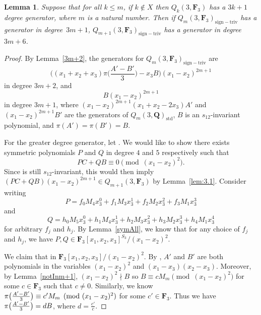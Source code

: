 \documentclass[11pt]{article}
\numberwithin{equation}{section}
\newtheorem{Lemma}[Theorem]{Lemma}
\theoremstyle{definition}
\numberwithin{equation}{section}
\newcommand{\std}{\mathrm{std}}
\newcommand{\siv}{\mathrm{sign-triv}}
\begin{document}
\begin{Lemma}\label{3m+6}
 Suppose that for all $k\leq m$, if $k\not\in X$ then $Q_k(3,\mathbf{F}_3)$ has a $3k+1$ degree generator, where $m$ is a natural number. Then if $Q_m(3,\mathbf{F}_3)_{\siv}$ has a generator in degree~${3m+1}$, $Q_{m+1}(3,\mathbf{F}_3)_{\siv}$ has a generator in degree $3m+6$.
\end{Lemma}
\begin{proof}
 By Lemma~\ref{3m+2}, the generators for $Q_m(3,\mathbf{F}_3)_{\siv}$ are
 \[\biggl((x_1+x_2+x_3)\pi\biggl(\frac{A'-B'}{3}\biggr)-x_3B\biggr)(x_1-x_2)^{2m+1}\]
 in degree $3m+2$, and
 \[B(x_1-x_2)^{2m+1}\]
 in degree $3m+1$, where $(x_1-x_2)^{2m+1}(x_1+x_2-2x_3)A'$ and $(x_1-x_2)^{2m+1}B'$ are the generators of $Q_m(3,\mathbf{Q})_{\std}$, $B$ is an $s_{12}$-invariant polynomial, and $\pi(A')=\pi(B')=B$.

 For the greater degree generator, let . We would like to show there exists symmetric polynomials $P$ and $Q$ in degree $4$ and $5$ respectively such that
 \[PC+QB \equiv 0\pmod{(x_1-x_2)^2}.\]
 Since  is still $s_{12}$-invariant, this would then imply $(PC+QB)(x_1-x_2)^{2m+1}\in Q_{m+1}(3,\mathbf{F}_3)$ by Lemma~\ref{lem:3.1}. Consider writing
 \[P=f_0M_4x_3^0+f_1M_{3}x_3^1 + f_{2}M_2x_3^{2}+f_{3}M_1x_3^{3}\]
 and
 \[Q=h_0M_5x_3^0+h_1M_4x_3^1+h_2M_3x_3^2+h_3M_2x_3^3+h_4M_1x_3^4\]
 for arbitrary $f_j$ and $h_j$. By Lemma~\ref{symAll}, we know that for any choice of $f_j$ and $h_j$, we have $P,Q\in \mathbf{F}_3[x_1,x_2,x_3]^{S_3}/(x_1-x_2)^2$.

 We claim that  in $\mathbf{F}_3[x_1,x_2,x_3]/(x_1-x_2)^2$. By \cite{wang2022explicit}, $A'$ and $B'$ are both polynomials in the variables $(x_1-x_2)^2$ and $(x_1-x_3)(x_2-x_3)$. Moreover, by Lemma~\ref{notInm+1}, $(x_1-x_2)^2\nmid B$ so $B\equiv cM_{m}\pmod{(x_1-x_2)^2}$ for some $c\in \mathbf{F}_3$ such that $c\neq 0 $. Similarly, we know $\smash{\pi\big(\frac{A'-B'}{3}\big)} \equiv c'M_{m}\pmod{(x_1-x_2)^2}$ for some $c'\in \mathbf{F}_3$. Thus we have $\smash{\pi\big(\frac{A'-B'}{3}\big)} = dB$, where $d=\frac{c'}{c}$.


\end{proof}
\end{document}
